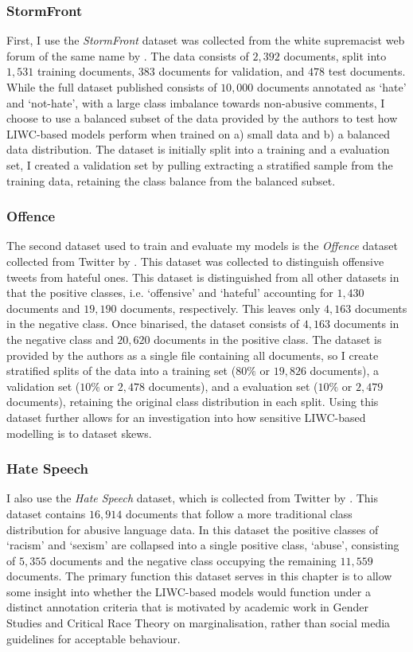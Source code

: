 \subsubsection{StormFront}
First, I use the \textit{StormFront} dataset was collected from the white supremacist web forum of the same name by \citet{Garcia:2019}. The data consists of $2,392$ documents, split into $1,531$ training documents, $383$ documents for validation, and $478$ test documents. While the full dataset published consists of $10,000$ documents annotated as `hate' and `not-hate', with a large class imbalance towards non-abusive comments, I choose to use a balanced subset of the data provided by the authors to test how LIWC-based models perform when trained on a) small data and b) a balanced data distribution.
The dataset is initially split into a training and a evaluation set, I created a validation set by pulling extracting a stratified sample from the training data, retaining the class balance from the balanced subset.

\subsubsection{Offence}
The second dataset used to train and evaluate my models is the \textit{Offence} dataset collected from Twitter by \citet{Davidson:2017}. This dataset was collected to distinguish offensive tweets from hateful ones. This dataset is distinguished from all other datasets in that the positive classes, i.e. `offensive' and `hateful' accounting for $1,430$ documents and $19,190$ documents, respectively. This leaves only $4,163$ documents in the negative class. Once binarised, the dataset consists of $4,163$ documents in the negative class and $20,620$ documents in the positive class. The dataset is provided by the authors as a single file containing all documents, so I create stratified splits of the data into a training set ($80\%$ or $19,826$ documents), a validation set ($10\%$ or $2,478$ documents), and a evaluation set ($10\%$ or $2,479$ documents), retaining the original class distribution in each split. Using this dataset further allows for an investigation into how sensitive LIWC-based modelling is to dataset skews.

\subsubsection{Hate Speech}
I also use the \textit{Hate Speech} dataset, which is collected from Twitter by \citet{Waseem-Hovy:2016}. This dataset contains $16,914$ documents that follow a more traditional class distribution for abusive language data. In this dataset the positive classes of `racism' and `sexism' are collapsed into a single positive class, `abuse', consisting of $5,355$ documents and the negative class occupying the remaining $11,559$ documents. The primary function this dataset serves in this chapter is to allow some insight into whether the LIWC-based models would function under a distinct annotation criteria that is motivated by academic work in Gender Studies and Critical Race Theory on marginalisation, rather than social media guidelines for acceptable behaviour.


